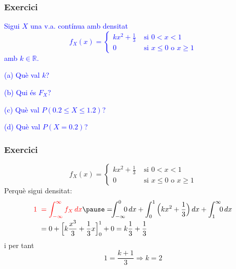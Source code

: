\documentclass[12pt,t]{beamer}\usepackage[]{graphicx}\usepackage[]{color}
\newcommand{\red}[1]{\textcolor{red}{#1}}
\newcommand{\blue}[1]{\textcolor{blue}{#1}}
\newcommand{\RR}{\mathbb{R}}
\renewcommand{\leq}{\leqslant}
\renewcommand{\geq}{\geqslant}
\theoremstyle{plain}
\theoremstyle{definition}
\begin{document}
\begin{frame}
\frametitle{Exercici}

\blue{Sigui $X$ una v.a. contínua  amb densitat
$$
f_X(x)=\left\{\begin{array}{ll}
kx^2+\frac{1}{3} & \mbox{ si } 0<x<1\\
0 & \mbox{ si $x\leq 0$ o $x\geq 1$}
\end{array}
\right.$$
amb $k\in \RR$.} 
\medskip

\blue{(a) Què val $k$?}
\medskip

\blue{(b) Qui és $F_X$?}
\medskip

\blue{(c) Què val $P(0.2\leq X\leq 1.2)$?}
\medskip

\blue{(d) Què val $P(X=0.2)$?}
\end{frame}

\begin{frame}
\frametitle{Exercici}
\vspace*{-1ex}

$$
f_X(x)=\left\{\begin{array}{ll}
kx^2+\frac{1}{3} & \mbox{ si } 0<x<1\\
0 & \mbox{ si $x\leq 0$ o $x\geq 1$}
\end{array}
\right.$$
Perquè sigui densitat:
$$
\begin{array}{rl}
\red{1}& \displaystyle \hspace*{-1ex}\red{=\int_{-\infty}^\infty f_X\,dx}\pause =\hspace*{-1ex}\int_{-\infty}^0 \hspace*{-1ex}0\,dx+\int_{0}^1 \Big(k x^2+\frac{1}{3}\Big)\, dx+\int_{1}^\infty \hspace*{-1ex}0\,dx\\[2ex] & \displaystyle \hspace*{-1ex}= 0+\Big[k\frac{x^3}{3}+\frac{1}{3}x\Big]_{0}^{1}+0 = k\frac{1}{3}+\frac{1}{3}
\end{array}
$$
i per tant 
$$1=\dfrac{k+1}{3}\Rightarrow k=2$$
\end{frame}
\end{document}
